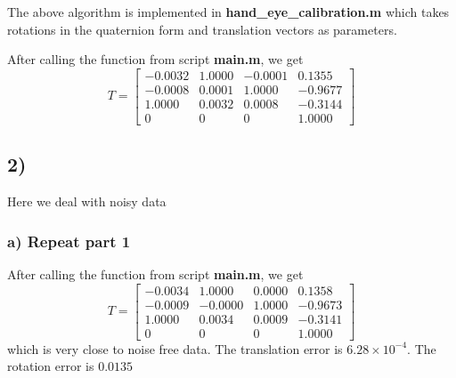 \documentclass[english,10pt,a4paper]{book}
\begin{document}
    The above algorithm is implemented in \textbf{hand\_eye\_calibration.m} which takes rotations in the quaternion form and translation vectors as parameters.
    
    After calling the function from script \textbf{main.m}, we get
    \begin{equation}
    	T = \begin{bmatrix}
    		-0.0032 & 1.0000 & -0.0001 & 0.1355\\
    		-0.0008 & 0.0001 & 1.0000 & -0.9677\\
    		1.0000 & 0.0032 & 0.0008 & -0.3144\\
    		0 & 0 & 0 & 1.0000
    	\end{bmatrix}
    \end{equation}
    
    \subsection*{2)}
    Here we deal with noisy data
    \subsubsection*{a) Repeat part 1}
    After calling the function from script \textbf{main.m}, we get
    \begin{equation}
    	T = \begin{bmatrix}
    		-0.0034 & 1.0000 & 0.0000 & 0.1358\\
    		-0.0009 & -0.0000 & 1.0000 & -0.9673\\
    		1.0000 & 0.0034 & 0.0009 & -0.3141\\
    		0 & 0 & 0 & 1.0000
    	\end{bmatrix}
    \end{equation}
    which is very close to noise free data. The translation error is \(6.28 \times 10^{-4}\). The rotation error is \(0.0135\)
    
\end{document}
